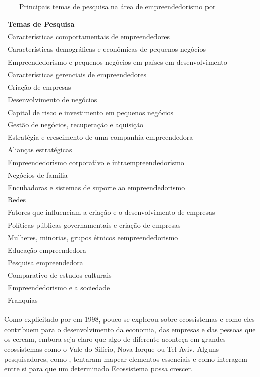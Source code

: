 \begin{table}[!htb]
	\centering
	\begin{tabular}{ | p{15cm} |}
		\hline
		Temas de Pesquisa \\ \hline
		Características comportamentais de empreendedores \\ \hline
		Características demográficas e econômicas de pequenos negócios \\ \hline
		Empreendedorismo e pequenos negócios em países em desenvolvimento \\ \hline
		Características gerenciais de empreendedores \\ \hline
		Criação de empresas \\ \hline
		Desenvolvimento de negócios \\ \hline
		Capital de risco e investimento em pequenos negócios \\ \hline
		Gestão de negócios, recuperação e aquisição \\ \hline
		Estratégia e crescimento de uma companhia empreendedora \\ \hline
		Alianças estratégicas \\ \hline
		Empreendedorismo corporativo e intraempreendedorismo \\ \hline
		Negócios de família \\ \hline
		Encubadoras e sistemas de suporte ao empreendedorismo \\ \hline
		Redes \\ \hline
		Fatores que influenciam a criação e o desenvolvimento de empresas \\ \hline
		Políticas públicas governamentais e criação de empresas \\ \hline
		Mulheres, minorias, grupos étnicos eempreendedorismo \\ \hline
		Educação empreendedora \\ \hline
		Pesquisa empreendedora \\ \hline
		Comparativo de estudos culturais\\ \hline
		Empreendedorismo e a sociedade \\ \hline
		Franquias \\ \hline
	\end{tabular}
	\caption{Principais temas de pesquisa na área de empreendedorismo por \cite{Filion1998}}
	\label{table:principais_temas_de_pesquisa_na_area_de_empreendedorismo}
\end{table}

Como explicitado por  em 1998, pouco se explorou sobre ecossistemas e como eles contribuem para o desenvolvimento da economia, das empresas e das pessoas que os cercam, embora seja claro que algo de diferente aconteça em grandes ecossistemas como o Vale do Silício, Nova Iorque ou Tel-Aviv. Alguns pesquisadores, como , tentaram mapear elementos essenciais e como interagem entre si para que um determinado Ecossistema possa crescer.

